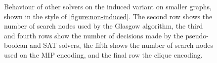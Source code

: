 \documentclass[twoside,11pt]{article}
\begin{document}
\begin{figure}[p]
    \caption{Behaviour of other solvers on the induced variant on smaller graphs, shown in the style of
        \cref{figure:non-induced}. The second row shows the number of search nodes used by the
    Glasgow algorithm, the third and fourth rows show the number of decisions made by the pseudo-boolean
and SAT solvers, the fifth shows the number of search nodes used on the MIP encoding, and the
final row the clique encoding.}\label{figure:alt}
\end{figure}
\end{document}
